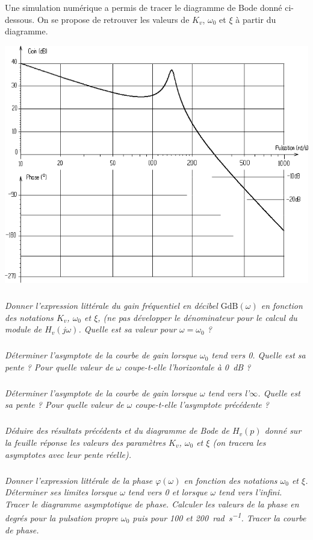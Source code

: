 \documentclass[10pt,fleqn]{article} %
\begin{document}
\begin{multicols}{2}
Une simulation numérique a permis de tracer le diagramme de Bode donné ci-dessous. On se propose de retrouver les valeurs de $K_v$, $\omega_0$ et $\xi$ à partir du diagramme.


\begin{center}
\includegraphics[width=\linewidth]{images/fig_02}
\end{center}

\subparagraph{}\textit{Donner l’expression littérale du gain fréquentiel en décibel $\text{GdB}(\omega)$ en fonction des notations $K_v$, $\omega_0$ et $\xi$, (ne pas développer le dénominateur pour le calcul du module de $H_v(j\omega)$. Quelle est sa valeur pour $\omega=\omega_0$ ?}

\subparagraph{}\textit{Déterminer l’asymptote de la courbe de gain lorsque 
$\omega_0$ tend vers 0. Quelle est sa pente ?
Pour quelle valeur de $\omega$ coupe-t-elle l’horizontale à \SI{0}{dB} ?}

\subparagraph{}\textit{Déterminer l’asymptote de la courbe de gain lorsque $\omega$ tend vers l'$\infty$. Quelle est sa pente ?	
Pour quelle valeur de $\omega$ coupe-t-elle l’asymptote précédente ?}

\subparagraph{}\textit{Déduire des résultats précédents et du diagramme de Bode de $H_v(p)$ donné sur la feuille réponse les valeurs des paramètres $K_v$, $\omega_0$ et $\xi$ (on tracera les asymptotes avec leur pente réelle).}



\subparagraph{}\textit{Donner l’expression littérale de la phase $\varphi(\omega)$ en fonction des notations $\omega_0$ et $\xi$.	
Déterminer ses limites lorsque $\omega$ tend vers 0 et lorsque $\omega$ tend vers l'infini.	
Tracer le diagramme asymptotique de phase.	
Calculer les valeurs de la phase en degrés pour la pulsation propre $\omega_0$ puis pour \num{100} et \SI{200}{rad.s^{-1}}. Tracer la courbe de phase.}



\end{multicols}
\end{document}
